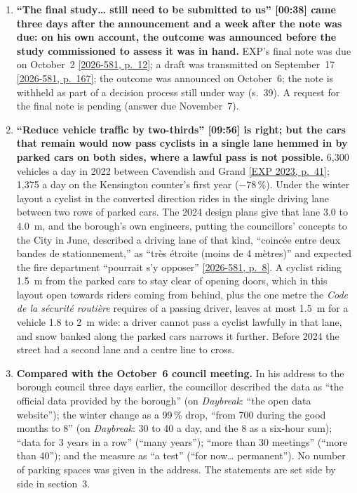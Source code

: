 \documentclass[10pt,letterpaper]{article}
\newcommand{\repourl}{https://github.com/OpenMobilityData/Terrebonne-open-sources}
\newcommand{\pagesurl}{https://openmobilitydata.github.io/Terrebonne-access-requests}
\newcommand{\cliptime}[1]{\textsf{\small[#1]}}
\newcommand{\pgl}[2]{\href{\pagesurl/2026-581/raw/01_emails_mandate_counts.pdf\#page=#1}{\textsf{\small[2026-581, p.~#2]}}}
\newcommand{\pg}[1]{\pgl{#1}{#1}}
\newcommand{\exppg}[1]{\href{\repourl/blob/main/2023-exp-mobility-study/raw/EXP_Etude_de_mobilite_rue_de_Terrebonne_2023.pdf}{\textsf{\small[EXP 2023, p.~#1]}}}
\begin{document}
\begin{enumerate}[nosep,itemsep=0.3em,leftmargin=1.4em]
  \item \begin{minipage}[t]{\linewidth}\textbf{``The final study… still need to be submitted to us'' \cliptime{00:38} came three days after the announcement and a week after the note was due: on his own account, the outcome was announced before the study commissioned to assess it was in hand.} EXP's final note was due on October~2 \pg{12}; a draft was transmitted on September~17 \pg{167}; the outcome was announced on October~6; the note is withheld as part of a decision process still under way (s.~39). A request for the final note is pending (answer due November~7).\end{minipage}\vspace{0.35em}
  \item \begin{minipage}[t]{\linewidth}\textbf{``Reduce vehicle traffic by two-thirds'' \cliptime{09:56} is right; but the cars that remain would now pass cyclists in a single lane hemmed in by parked cars on both sides, where a lawful pass is not possible.} 6{,}300 vehicles a day in 2022 between Cavendish and Grand \exppg{41}; 1{,}375 a day on the Kensington counter's first year ($-78$\,\%). Under the winter layout a cyclist in the converted direction rides in the single driving lane between two rows of parked cars. The 2024 design plans give that lane 3.0 to 4.0~m, and the borough's own engineers, putting the councillors' concepts to the City in June, described a driving lane of that kind, ``coincée entre deux bandes de stationnement,'' as ``très étroite (moins de 4 mètres)'' and expected the fire department ``pourrait s'y opposer'' \pg{8}. A cyclist riding 1.5~m from the parked cars to stay clear of opening doors, which in this layout open towards riders coming from behind, plus the one metre the \emph{Code de la sécurité routière} requires of a passing driver, leaves at most 1.5~m for a vehicle 1.8 to 2~m wide: a driver cannot pass a cyclist lawfully in that lane, and snow banked along the parked cars narrows it further. Before 2024 the street had a second lane and a centre line to cross.\end{minipage}\vspace{0.35em}
  \item \begin{minipage}[t]{\linewidth}\textbf{Compared with the October~6 council meeting.} In his address to the borough council three days earlier, the councillor described the data as ``the official data provided by the borough'' (on \emph{Daybreak}: ``the open data website''); the winter change as a 99\,\% drop, ``from 700 during the good months to 8'' (on \emph{Daybreak}: 30 to 40 a day, and the 8 as a six-hour sum); ``data for 3 years in a row'' (``many years''); ``more than 30 meetings'' (``more than 40''); and the measure as ``a test'' (``for now… permanent''). No number of parking spaces was given in the address. The statements are set side by side in section~3.\end{minipage}\vspace{0.35em}
\end{enumerate}
\end{document}
